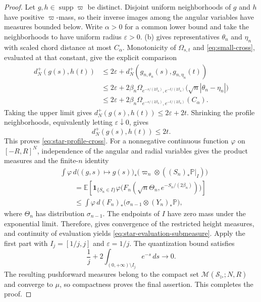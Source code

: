 \documentclass{amsart}
\numberwithin{equation}{section}
\theoremstyle{plain}
\theoremstyle{definition}
\theoremstyle{remark}
\DeclareMathOperator{\supp}{supp}
\newcommand{\eps}{\varepsilon}
\begin{document}
\begin{proof}
Let $g,h\in\supp\varpi$ be distinct.  Disjoint uniform neighborhoods of $g$ and $h$ have positive $\varpi$-mass, so their inverse images among the angular variables have measures bounded below.  Write $\alpha>0$ for a common lower bound and take the neighborhoods to have uniform radius $\eps>0$.  (b) gives representatives $\theta_n$ and $\eta_n$ with scaled chord distance at most $C_\alpha$.  Monotonicity of $\Omega_{s,t}$ and \eqref{eq:small-cross}, evaluated at that constant, give the explicit comparison
\[
 \begin{aligned}
d_N^+(g(s),h(t)) &\le2\eps+d_N^+(g_{n,\theta_n}(s),g_{n,\eta_n}(t))\\
 &\le2\eps+2\beta_n\Omega_{e^{-s/(2\beta_n)},e^{-t/(2\beta_n)}}
 \bigl(\sqrt n|\theta_n-\eta_n|\bigr)\\
 &\le2\eps+2\beta_n\Omega_{e^{-s/(2\beta_n)},e^{-t/(2\beta_n)}}(C_\alpha).
 \end{aligned}
\]
Taking the upper limit gives $d_N^+(g(s),h(t))\le2\eps+2t$.  Shrinking the profile neighborhoods, equivalently letting $\eps\downarrow0$, gives
\[ d_N^+(g(s),h(t))\le2t. \]
This proves \eqref{eq:star-profile-cross}.  For a nonnegative continuous function $\varphi$ on $[-R,R]^N$, independence of the angular and radial variables gives the product measures and the finite-$n$ identity
\[
 \begin{aligned}
&\int\varphi\,d\bigl((g,s)\mapsto g(s)\bigr)_* \bigl(\varpi_n\otimes((S_n)_*\mathbb P|_I)\bigr)\\
 &\qquad=\mathbb E\left[\mathbf 1_{\{S_n\in I\}}
 \varphi\bigl(F_n(\sqrt n\Theta_n,e^{-S_n/(2\beta_n)})\bigr)\right]\\
&\qquad\le\int\varphi\,d(F_n)_* \bigl(\sigma_{n-1}\otimes(Y_n)_*\mathbb P\bigr),
 \end{aligned}
\]
where $\Theta_n$ has distribution $\sigma_{n-1}$.  The endpoints of $I$ have zero mass under the exponential limit.  Therefore,  gives convergence of the restricted height measures, and continuity of evaluation yields \eqref{eq:star-evaluation-submeasure}.  Apply the first part with $I_j=[1/j,j]$ and $\eps=1/j$.  The quantization bound satisfies
\[ \frac1j+2\int_{(0,+\infty)\setminus I_j}e^{-s}\,ds\longrightarrow0. \]
The resulting pushforward measures belong to the compact set $\mathcal M(\mathcal S_{\rhd};N,R)$ and converge to $\mu$, so compactness proves the final assertion.  This completes the proof.
\end{proof}
\end{document}
